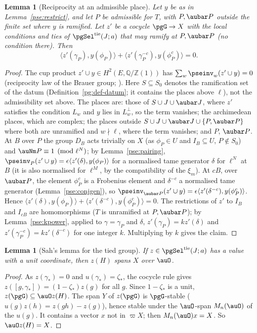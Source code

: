 \documentclass[10pt]{amsart}
\newtheorem{lemma}[theorem]{Lemma}
\theoremstyle{definition}
\theoremstyle{remark}
\newcommand{\Z}{\mathbb Z}
\newcommand{\Q}{\mathbb Q}
\begin{document}
\begin{lemma}[Reciprocity at an admissible place]\label{pse:reciprocity}
Let $y$ be as in Lemma~\ref{pse:restrict}, and let $P$ be admissible for $T$, with $P,\aubar P$
outside the finite set where $y$ is ramified. Let $z'$ be a cocycle $\pgG\to X$ with the local
conditions and ties of $\pgSel^{\mathrm{tie}}(J;a)$ that may ramify at $P,\aubar P$ (no condition
there). Then
\[
\bigl\langle z'(\gamma_P),y(\phi_P)\bigr\rangle+\bigl\langle z'(\gamma_P^{-c}),y(\phi_P^{c})\bigr
\rangle=0 .
\]
\end{lemma}
\begin{proof}
The cup product $z'\cup y\in H^2(E,\Q/\Z(1))$ has $\sum_w\pseinv_w(z'\cup y)=0$ (reciprocity law of
the Brauer group; \cite[Theorem~8.1.17]{NSW}). Here $S\subseteq S_0$ denotes the ramification set of the datum (Definition~\ref{pg:def-datum}; it contains the places above $\ell$), not the admissibility set above. The places are: those of $S\cup J\cup\aubar J$, where
$z'$ satisfies the condition $L_w$ and $y$ lies in $L_w^\perp$, so the term vanishes; the
archimedean places, which are complex; the places outside $S\cup J\cup\aubar J\cup\{P,\aubar P\}$
where both are unramified and $w\nmid\ell$, where the term vanishes; and $P$, $\aubar P$. At $B$
over $P$ the group $D_B$ acts trivially on $X$ (as $\phi_P\in U$ and $I_B\subseteq U$, $P\notin
S_0$) and $\auNm P\equiv1\pmod{\ell^N}$; by Lemma~\ref{pse:pairing}, $\pseinv_P(z'\cup y)=\epsilon
\langle z'(\delta),y(\phi_P)\rangle$ for a normalised tame generator $\delta$ for $\ell^N$ at $B$ (it is also
normalised for $\ell^M$, by the compatibility of the $\xi_m$). At
$cB$, over $\aubar P$, the element $\phi_P^c$ is a Frobenius element and $\delta^{-c}$ a normalised
tame generator (Lemma~\ref{pse:conjgen}), so $\pseinv_{\aubar P}(z'\cup y)=\epsilon\langle z'(
\delta^{-c}),y(\phi_P^c)\rangle$. Hence $\langle z'(\delta),y(\phi_P)\rangle+\langle z'(\delta^{-c}),
y(\phi_P^c)\rangle=0$. The restrictions of $z'$ to $I_B$ and $I_{cB}$ are homomorphisms ($T$ is
unramified at $P,\aubar P$); by Lemma~\ref{pse:kpower}, applied to $\gamma=\gamma_P$ and $\delta$, $z'(\gamma_P)=k z'(\delta)$ and $z'(\gamma_P^{-c})=kz'(\delta^{-c})$
for one integer $k$. Multiplying by $k$ gives the claim.
\end{proof}

\begin{lemma}[Sah's lemma for the tied group]\label{pse:span}
If $z\in\pgSel^{\mathrm{tie}}(J;a)$ has a value with a unit coordinate, then $z(H)$ spans $X$
over $\auO$.
\end{lemma}
\begin{proof}
As $z(\gamma_*)=0$ and $u(\gamma_*)=\zeta_*$, the cocycle rule gives $z([g,\gamma_*])=(1-\zeta_*)
z(g)$ for all $g$. Since $1-\zeta_*$ is a unit, $z(\pgG)\subseteq\auO z(H)$. The span $Y$ of
$z(\pgG)$ is $\pgG$-stable ($u(g)z(h)=z(gh)-z(g)$), hence stable under the $\auO$-span $M_n(\auO)$ of
the $u(g)$. It contains a vector $x$ not in $\varpi X$; then $M_n(\auO)x=X$. So $\auO z(H)=X$.
\end{proof}
\end{document}
